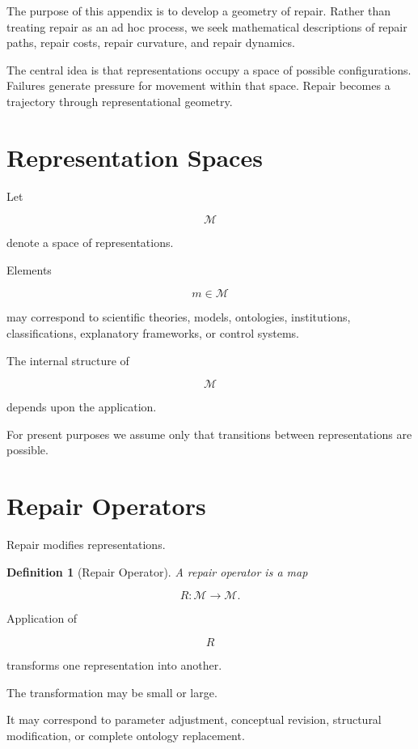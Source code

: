 \documentclass[11pt,oneside,openany]{book}
\newtheorem{definition}{Definition}[chapter] \newtheorem{theorem}{Theorem}[chapter] \newtheorem{proposition}{Proposition}[chapter] \newtheorem{lemma}{Lemma}[chapter] \newtheorem{corollary}{Corollary}[chapter] \newtheorem{remark}{Remark}[chapter]
\begin{document}
The purpose of this appendix is to develop a geometry of repair. Rather than treating repair as an ad hoc process, we seek mathematical descriptions of repair paths, repair costs, repair curvature, and repair dynamics.

The central idea is that representations occupy a space of possible configurations. Failures generate pressure for movement within that space. Repair becomes a trajectory through representational geometry.

\section{Representation Spaces}

Let

\[
\mathcal M
\]

denote a space of representations.

Elements

\[
m\in\mathcal M
\]

may correspond to scientific theories, models, ontologies, institutions, classifications, explanatory frameworks, or control systems.

The internal structure of

\[
\mathcal M
\]

depends upon the application.

For present purposes we assume only that transitions between representations are possible.

\section{Repair Operators}

Repair modifies representations.

\begin{definition}[Repair Operator]

A repair operator is a map

\[
R:\mathcal M\rightarrow\mathcal M.
\]

\end{definition}

Application of

\[
R
\]

transforms one representation into another.

The transformation may be small or large.

It may correspond to parameter adjustment, conceptual revision, structural modification, or complete ontology replacement.
\end{document}
